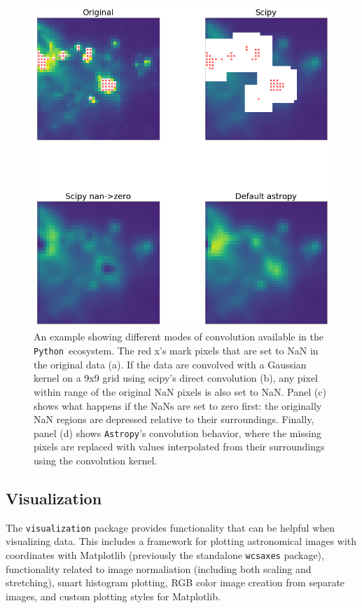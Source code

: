 \documentclass[modern]{aastex61}
\newcommand{\package}[1]{\texttt{#1}}
\newcommand{\python}{\package{Python}}
\newcommand{\astropypkg}{\package{Astropy}}
\begin{document}
\begin{figure}
\includegraphics[width=\textwidth]{convolution_example.png}
An example showing different modes of convolution available in the \python\ ecosystem.  The red x's mark pixels that are set to NaN in the original data (a).  If the data are convolved with a Gaussian kernel on a 9x9 grid using scipy's direct convolution (b), any pixel within range of the original NaN pixels is also set to NaN.  Panel (c) shows what happens if the NaNs are set to zero first: the originally NaN regions are depressed relative to their surroundings.  Finally, panel (d) shows \astropypkg's convolution behavior, where the missing pixels are replaced with values interpolated from their surroundings using the convolution kernel.
\end{figure}


\subsection{Visualization}

The \package{visualization} package provides functionality that can be helpful when visualizing data. This includes a framework for plotting astronomical images with coordinates with Matplotlib (previously the standalone \package{wcsaxes} package), functionality related to image normaliation (including both scaling and stretching), smart histogram plotting, RGB color image creation from separate images, and custom plotting styles for Matplotlib.
\end{document}
